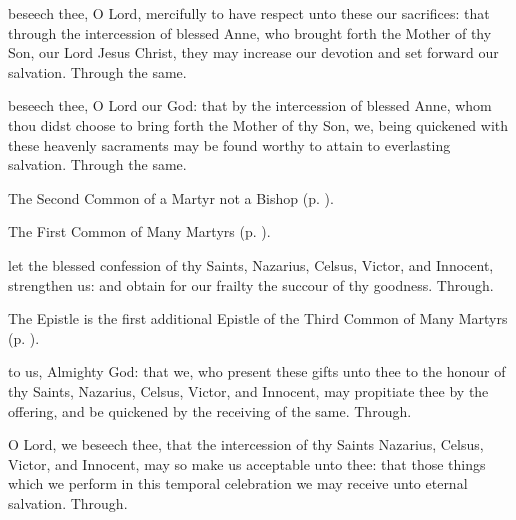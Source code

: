 
\secret
{} beseech thee, O Lord, mercifully to have respect unto these our sacrifices: that through the intercession of blessed Anne, who brought forth the Mother of thy Son, our Lord Jesus Christ, they may increase our devotion and set forward our salvation. Through the same.


\postcommunion
{} beseech thee, O Lord our God: that by the intercession of blessed Anne, whom thou didst choose to bring forth the Mother of thy Son, we, being quickened with these heavenly sacraments may be found worthy to attain to everlasting salvation. Through the same.



\begin{rubric}
	The Second Common of a Martyr not a Bishop (p. \pageref{CommonMartyrNotBishopII}).
\end{rubric}



\begin{rubric}
	The First Common of Many Martyrs (p. \pageref{CommonMartyrsI}).
\end{rubric}

\collect
{} let the blessed confession of thy Saints, Nazarius, Celsus, Victor, and Innocent, strengthen us: and obtain for our frailty the succour of thy goodness. Through.

\begin{rubric}
	The Epistle is the first additional Epistle of the Third Common of Many Martyrs (p. \pageref{Wisdom1017}).
\end{rubric}

\secret
{} to us, Almighty God: that we, who present these gifts unto thee to the honour of thy Saints, Nazarius, Celsus, Victor, and Innocent, may propitiate thee by the offering, and be quickened by the receiving of the same. Through.

\postcommunion
{} O Lord, we beseech thee, that the intercession of thy Saints Nazarius, Celsus, Victor, and Innocent, may so make us acceptable unto thee: that those things which we perform in this temporal celebration we may receive unto eternal salvation. Through.



